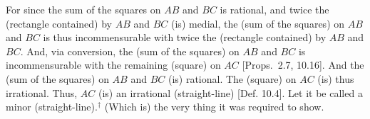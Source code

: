 \begin{Parallel}{}{}
{For since the sum of the squares on $AB$ and $BC$ is rational, and twice
the (rectangle contained) by $AB$ and $BC$ (is) medial, the (sum of the squares) on $AB$ and $BC$ is thus incommensurable with twice the
(rectangle contained) by $AB$ and $BC$. And, via conversion, 
the (sum of the squares) on $AB$ and $BC$ is incommensurable with the
remaining (square) on $AC$ [Props.~2.7, 10.16]. And the (sum of the squares) on $AB$
and $BC$ (is) rational. The (square) on $AC$ (is) thus irrational. Thus, 
$AC$ (is) an irrational (straight-line) [Def. 10.4]. Let it be
called a minor (straight-line).$^\dag$ (Which is) the very thing it
was required to show.}
\end{Parallel}


\vspace{7pt}{\footnotesize\noindent$^\dag$ See footnote to Prop.~10.39.}

